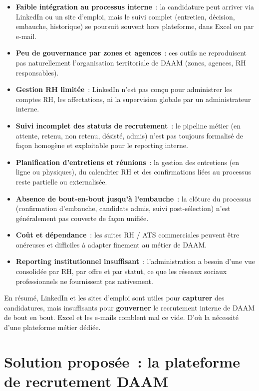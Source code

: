 \begin{itemize}
  \item \textbf{Faible intégration au processus interne}~: la candidature peut
        arriver via LinkedIn ou un site d'emploi, mais le suivi complet
        (entretien, décision, embauche, historique) se poursuit souvent hors
        plateforme, dans Excel ou par e-mail.
  \item \textbf{Peu de gouvernance par zones et agences}~: ces outils ne
        reproduisent pas naturellement l'organisation territoriale de DAAM
        (zones, agences, RH responsables).
  \item \textbf{Gestion RH limitée}~: LinkedIn n'est pas conçu pour
        administrer les comptes RH, les affectations, ni la supervision
        globale par un administrateur interne.
  \item \textbf{Suivi incomplet des statuts de recrutement}~: le pipeline
        métier (en attente, retenu, non retenu, désisté, admis) n'est pas
        toujours formalisé de façon homogène et exploitable pour le reporting
        interne.
  \item \textbf{Planification d'entretiens et réunions}~: la gestion des
        entretiens (en ligne ou physiques), du calendrier RH et des
        confirmations liées au processus reste partielle ou externalisée.
  \item \textbf{Absence de bout-en-bout jusqu'à l'embauche}~: la clôture du
        processus (confirmation d'embauche, candidats admis, suivi post-sélection)
        n'est généralement pas couverte de façon unifiée.
  \item \textbf{Coût et dépendance}~: les suites RH / ATS commerciales peuvent
        être onéreuses et difficiles à adapter finement au métier de DAAM.
  \item \textbf{Reporting institutionnel insuffisant}~: l'administration a
        besoin d'une vue consolidée par RH, par offre et par statut, ce que
        les réseaux sociaux professionnels ne fournissent pas nativement.
\end{itemize}

En résumé, LinkedIn et les sites d'emploi sont utiles pour \textbf{capturer}
des candidatures, mais insuffisants pour \textbf{gouverner} le recrutement
interne de DAAM de bout en bout. Excel et les e-mails comblent mal ce vide.
D'où la nécessité d'une plateforme métier dédiée.


\section{Solution proposée~: la plateforme de recrutement DAAM}

